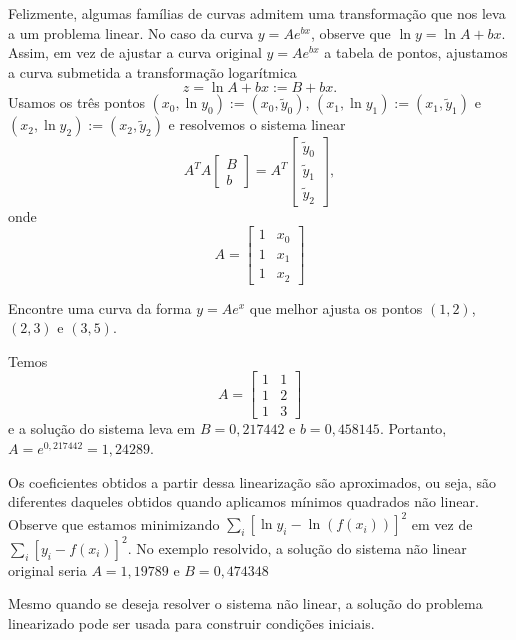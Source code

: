 \documentclass[main.tex]{subfiles}
\begin{document}
Felizmente, algumas famílias de curvas admitem uma transformação que nos leva a um problema linear. No caso da curva $y=Ae^{bx}$, observe que $\ln y=\ln A+bx$. Assim, em vez de ajustar a curva original $y=Ae^{bx}$ a tabela de pontos, ajustamos a curva submetida a transformação logarítmica
$$
z=\ln A+bx:=B+bx.
$$
Usamos os três pontos $(x_0,\ln y_0):=(x_0, \tilde{y}_0)$, $(x_1,\ln y_1):=(x_1,\tilde{y}_1)$ e $(x_2,\ln y_2):=(x_2,\tilde{y}_2)$ e resolvemos o sistema linear
$$
A^T A \left[\begin{array}{c} B\\b \end{array}\right]=A^T\left[\begin{array}{c}\tilde{y}_0\\\tilde{y}_1\\\tilde{y}_2 \end{array}\right],
$$
onde
$$
A=\left[\begin{array}{cc} 1&x_0\\1&x_1\\1&x_2 \end{array}\right]
$$
\begin{ex}Encontre uma curva da forma $y=Ae^x$ que melhor ajusta os pontos $(1,2)$, $(2,3)$ e $(3,5)$.
\end{ex}
Temos
$$
A=\left[\begin{array}{cc} 1&1\\1&2\\1&3 \end{array}\right]
$$
e a solução do sistema leva em $B=0,217442$ e $b=0,458145$. Portanto, $A=e^{0,217442}=1,24289$.

\begin{obs}
Os coeficientes obtidos a partir dessa linearização são aproximados, ou seja, são diferentes daqueles obtidos quando aplicamos mínimos quadrados não linear. Observe que estamos minimizando $\displaystyle\sum_i [\ln y_i -\ln (f(x_i))]^2$ em vez de $\displaystyle\sum_i [ y_i -f(x_i)]^2$. No exemplo resolvido, a solução do sistema não linear original seria $A=1,19789$ e $B=0,474348$
\end{obs}

\begin{obs}
Mesmo quando se deseja resolver o sistema não linear, a solução do problema linearizado pode ser usada para construir condições iniciais.
\end{obs}
\end{document}
